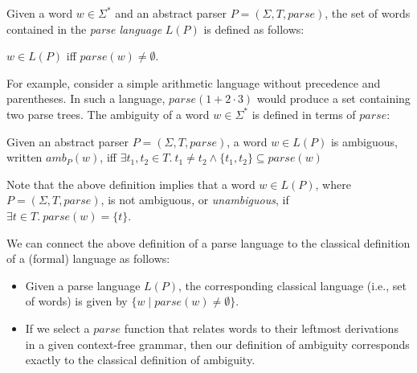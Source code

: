 \documentclass[runningheads]{llncs}
\newcommand{\T}{\Sigma} %
\newcommand{\parse}{\mathit{parse}} %
\newcommand{\amb}{\mathit{amb}}
\begin{document}
\begin{definition}
  Given a word $w \in \T^{*}$ and an abstract parser $P = (\T, T,
  \parse)$, the set of words contained in the \emph{parse language}
  $L(P)$ is defined as follows:

  $w \in L(P)$ iff $\parse(w) \neq \emptyset$.
\end{definition}

\noindent For example, consider a simple arithmetic language without precedence and parentheses. In such a language, $\parse(1 + 2 \cdot 3)$ would produce a set containing two parse trees. %
%
%
The ambiguity of a word $w \in \T^{*}$ is defined in terms of $\parse$:

\begin{definition}
  Given an abstract parser $P = (\T, T, \parse)$, a word $w \in L(P)$
  is ambiguous, written $\amb_P(w)$, iff
%
  $\exists t_1, t_2 \in T.\ t_1 \neq t_2 \land \{t_1, t_2\} \subseteq \parse(w)$
\end{definition}

\noindent
Note that the above definition implies that a word $w \in L(P)$, where
$P = (\T, T, \parse)$, is not ambiguous, or \emph{unambiguous}, if
$\exists t \in T.\ \parse(w) = \{t\}$.

We can connect the above definition of a parse language to the
classical definition of a (formal) language as follows:

\begin{itemize}
\item Given a parse language $L(P)$, the corresponding classical language (i.e., set of words) is given by $\{ w \mid \parse(w) \neq \emptyset \}$.
\item If we select a $\parse$ function that relates words to their leftmost derivations in a given context-free grammar, then our definition of ambiguity corresponds exactly to the classical definition of ambiguity.
\end{itemize}
\end{document}
